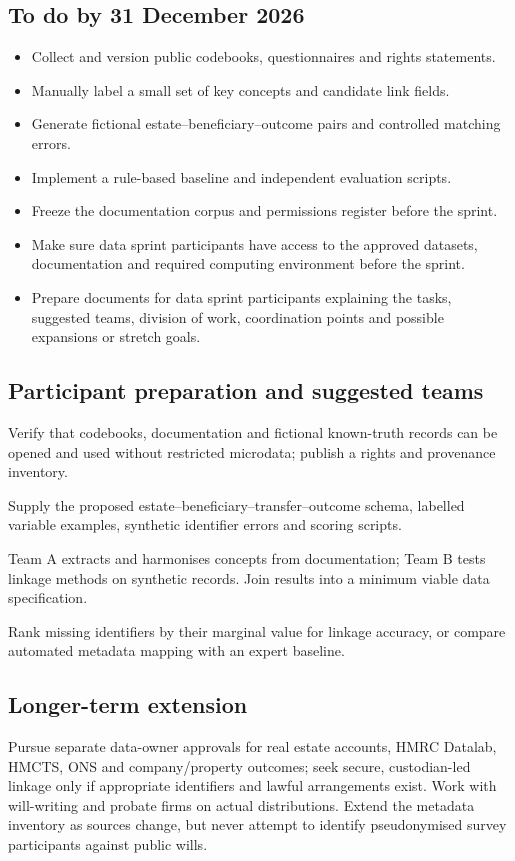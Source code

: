 \subsection{To do by 31 December 2026}
\begin{itemize}[nosep]
\item Collect and version public codebooks, questionnaires and rights statements.
\item Manually label a small set of key concepts and candidate link fields.
\item Generate fictional estate--beneficiary--outcome pairs and controlled matching errors.
\item Implement a rule-based baseline and independent evaluation scripts.
\item Freeze the documentation corpus and permissions register before the sprint.
\item Make sure data sprint participants have access to the approved datasets, documentation and required computing environment before the sprint.
\item Prepare documents for data sprint participants explaining the tasks, suggested teams, division of work, coordination points and possible expansions or stretch goals.
\end{itemize}

\subsection{Participant preparation and suggested teams}
\begin{description}[style=nextline]
\item[Access preflight] Verify that codebooks, documentation and fictional known-truth records can be opened and used without restricted microdata; publish a rights and provenance inventory.
\item[Participant brief] Supply the proposed estate--beneficiary--transfer--outcome schema, labelled variable examples, synthetic identifier errors and scoring scripts.
\item[Suggested teams] Team A extracts and harmonises concepts from documentation; Team B tests linkage methods on synthetic records. Join results into a minimum viable data specification.
\item[Stretch goals] Rank missing identifiers by their marginal value for linkage accuracy, or compare automated metadata mapping with an expert baseline.
\end{description}

\subsection{Longer-term extension}
Pursue separate data-owner approvals for real estate accounts, HMRC Datalab, HMCTS, ONS and company/property outcomes; seek secure, custodian-led linkage only if appropriate identifiers and lawful arrangements exist. Work with will-writing and probate firms on actual distributions. Extend the metadata inventory as sources change, but never attempt to identify pseudonymised survey participants against public wills.
